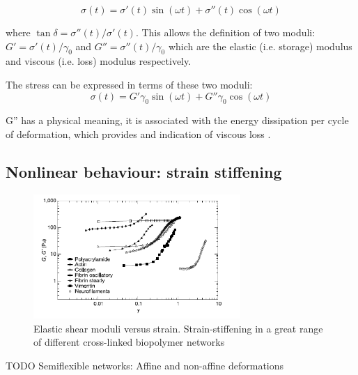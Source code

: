 \begin{equation}\label{viscoelastic-stress}
\sigma(t) = \sigma'(t) \sin(\omega t) + \sigma''(t)\cos(\omega t)
\end{equation}

where $ \tan \delta=\sigma''(t)/\sigma'(t)$. This allows the definition of two
moduli: $G'=\sigma'(t)/\gamma_0$ and $G''=\sigma''(t)/\gamma_0$ which are the
elastic (i.e. storage) modulus and viscous (i.e. loss) modulus respectively.

The stress can be expressed in terms of these two moduli:
\begin{equation}\label{viscoelastic-stress-G}
\sigma(t) = G'\gamma_0 \sin(\omega t) + G''\gamma_0\cos(\omega t)
\end{equation}

G'' has a physical meaning, it is associated with the energy dissipation per
cycle of deformation, which provides and indication of viscous loss
\citep{macosko_rheology:_1994}.
\subsection{Nonlinear behaviour: strain stiffening}

\begin{figure}[h]
\begin{center}
\includegraphics[width=0.7\textwidth,height=0.5\textwidth]{Figures/strainstiffening_storm.png}%

\caption[Strain-stiffening in semiflexible
polymers]{ Elastic shear moduli versus
strain. Strain-stiffening in a great range of different cross-linked biopolymer
networks\citep{storm_nonlinear_2005,carrillo_nonlinear_2013}}
\label{fig:strainstiffening-storm}
\end{center}
\end{figure}
 TODO
 Semiflexible networks:
Affine and non-affine deformations

